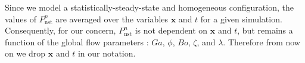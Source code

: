 Since we model a statistically-steady-state and homogeneous configuration, the values of $P_\text{nst}^n$ are averaged over the variables $\mathbf{x}$ and $t$ for a given simulation. 
Consequently, for our concern, $P_\text{nst}^n$ is not dependent on $\mathbf{x}$ and $t$, but remains a function of the global flow parameters :  $Ga$, $\phi$, $Bo$, $\zeta$, and $\lambda$.
Therefore from now on we drop $\mathbf{x}$ and $t$ in our notation. 
